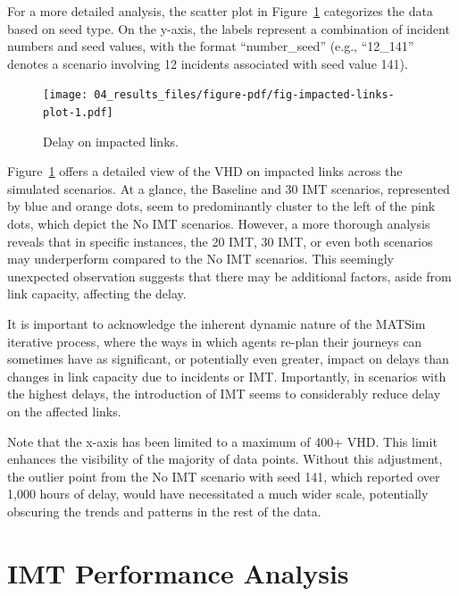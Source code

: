 \documentclass[fancy, oneside, mastersfancy, ms]{byuthesis}
\begin{document}
For a more detailed analysis, the scatter plot in
Figure~\ref{fig-impacted-links-plot} categorizes the data based on seed
type. On the y-axis, the labels represent a combination of incident
numbers and seed values, with the format ``number\_seed'' (e.g.,
``12\_141'' denotes a scenario involving 12 incidents associated with
seed value 141).

\begin{figure}

{\centering \texttt{[image: 04\_results\_files/figure-pdf/fig-impacted-links-plot-1.pdf]}

}

\caption{\label{fig-impacted-links-plot}Delay on impacted links.}

\end{figure}

Figure~\ref{fig-impacted-links-plot} offers a detailed view of the VHD
on impacted links across the simulated scenarios. At a glance, the
Baseline and 30 IMT scenarios, represented by blue and orange dots, seem
to predominantly cluster to the left of the pink dots, which depict the
No IMT scenarios. However, a more thorough analysis reveals that in
specific instances, the 20 IMT, 30 IMT, or even both scenarios may
underperform compared to the No IMT scenarios. This seemingly unexpected
observation suggests that there may be additional factors, aside from
link capacity, affecting the delay.

It is important to acknowledge the inherent dynamic nature of the MATSim
iterative process, where the ways in which agents re-plan their journeys
can sometimes have as significant, or potentially even greater, impact
on delays than changes in link capacity due to incidents or IMT.
Importantly, in scenarios with the highest delays, the introduction of
IMT seems to considerably reduce delay on the affected links.

Note that the x-axis has been limited to a maximum of 400+ VHD. This
limit enhances the visibility of the majority of data points. Without
this adjustment, the outlier point from the No IMT scenario with seed
141, which reported over 1,000 hours of delay, would have necessitated a
much wider scale, potentially obscuring the trends and patterns in the
rest of the data.

\hypertarget{imt-performance-analysis}{%
\section{IMT Performance Analysis}\label{imt-performance-analysis}}
\end{document}
